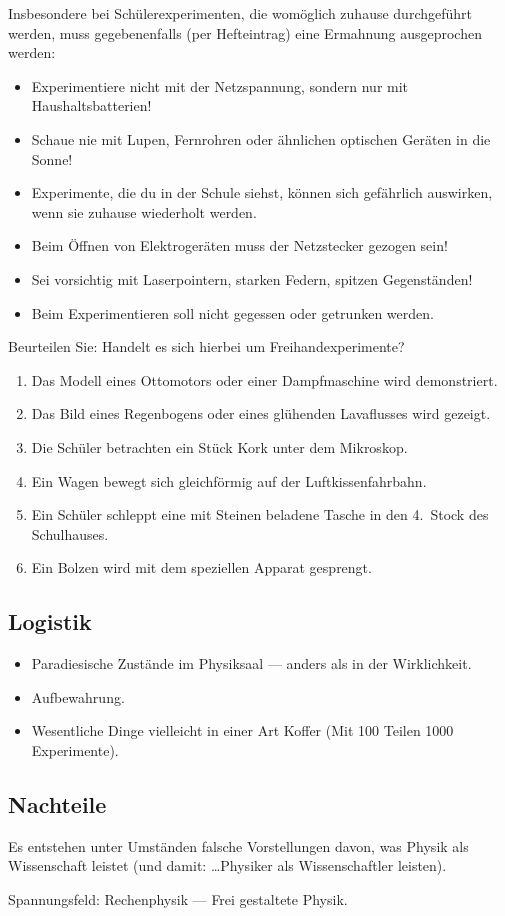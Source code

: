 \begin{itemize}
	\mip
	Insbesondere bei Sch\"{u}lerexperimenten, die wom\"{o}glich zuhause
	durchgef\"{u}hrt werden, muss gegebenenfalls (per Hefteintrag)
	eine Ermahnung ausgeprochen werden:
	\begin{itemize}
		\item
		Experimentiere nicht mit der Netzspannung, sondern nur mit
		Haushaltsbatterien!
		\item
		Schaue nie mit Lupen, Fernrohren oder \"{a}hnlichen optischen
		Ger\"{a}ten in die Sonne!
		\item
		Experimente, die du in der Schule siehst, k\"{o}nnen sich
		gef\"{a}hrlich auswirken, wenn sie zuhause wiederholt werden.
		\item
		Beim \"{O}ffnen von Elektroger\"{a}ten muss der Netzstecker gezogen sein!
		\item
		Sei vorsichtig mit Laserpointern, starken Federn, spitzen
		Gegenst\"{a}nden!
		\item
		Beim Experimentieren soll nicht gegessen oder getrunken werden.
	\end{itemize}

\end{itemize}

\begin{uea}
	Beurteilen Sie: Handelt es sich hierbei um Freihandexperimente?
	\begin{enumerate}[label=\alph*.]
			\item
		Das Modell eines Ottomotors oder einer Dampfmaschine
		wird demonstriert.
		\item
		Das Bild eines Regenbogens oder eines gl\"{u}henden Lavaflusses
		wird gezeigt.
		\item
		Die Sch\"{u}ler betrachten ein St\"{u}ck Kork unter dem Mikroskop.
		\item
		Ein Wagen bewegt sich gleichf\"{o}rmig auf der Luftkissenfahrbahn.
		\item
		Ein Sch\"{u}ler schleppt eine mit Steinen beladene Tasche in den
		4.\ Stock des Schulhauses.
		\item
		Ein Bolzen wird mit dem speziellen Apparat gesprengt. 
	\end{enumerate}
\end{uea}

\subsection{Logistik}

\begin{itemize}
	\item Paradiesische Zust\"{a}nde im Physiksaal ---  anders als in der Wirklichkeit.
	\item Aufbewahrung.
	\item Wesentliche Dinge vielleicht in einer Art Koffer (Mit 100 Teilen 1000 Experimente).
\end{itemize}

\subsection{Nachteile}

Es entstehen unter Umst\"{a}nden falsche Vorstellungen davon,
was Physik als Wissenschaft leistet
(und damit: \dots Physiker als Wissenschaftler leisten).

Spannungsfeld: Rechenphysik --- Frei gestaltete Physik.
